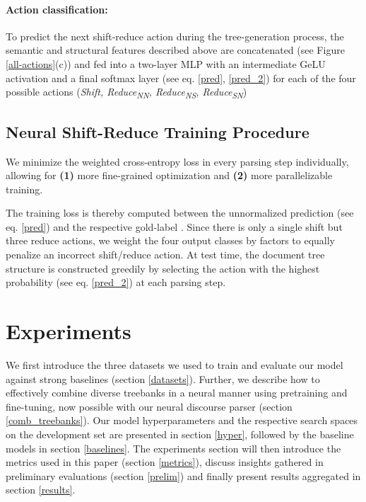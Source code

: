 \documentclass[11pt]{article}
\begin{document}
\paragraph{Action classification:} To predict the next shift-reduce action during the tree-generation process, the semantic  and structural features described above are concatenated (see Figure \ref{all-actions}(c)) and fed into a two-layer MLP with an intermediate GeLU \cite{hendrycks2016gaussian} activation and a final softmax layer (see eq. \ref{pred}, \ref{pred_2})  for each of the four possible actions (\textit{Shift, Reduce\textsubscript{NN}, Reduce\textsubscript{NS}, Reduce\textsubscript{SN}})





\subsection{Neural Shift-Reduce Training Procedure} 
\label{training_section}
We minimize the weighted cross-entropy loss in every parsing step individually, allowing for \textbf{(1)} more fine-grained optimization and \textbf{(2)} more parallelizable training. 

The training loss is thereby computed between the unnormalized prediction  (see eq. \ref{pred}) and the respective gold-label . Since there is only a single shift but three reduce actions, we weight the four output classes by factors  to equally penalize an incorrect shift/reduce action.
At test time, the document tree structure is constructed greedily by selecting the action with the highest probability (see eq. \ref{pred_2}) at each parsing step.

\section{Experiments}
\label{experiments}
We first introduce the three datasets we used to train and evaluate our model against strong baselines (section \ref{datasets}). Further, we describe how to effectively combine diverse treebanks in a neural manner using pretraining and fine-tuning, now possible with our neural discourse parser (section \ref{comb_treebanks}). Our model hyperparameters and the respective search spaces on the development set are  presented in section \ref{hyper}, followed by the baseline models in section \ref{baselines}. The experiments section will then introduce the metrics used in this paper (section \ref{metrics}), discuss insights gathered in preliminary evaluations (section \ref{prelim}) and finally present results aggregated in section \ref{results}. 
\end{document}
